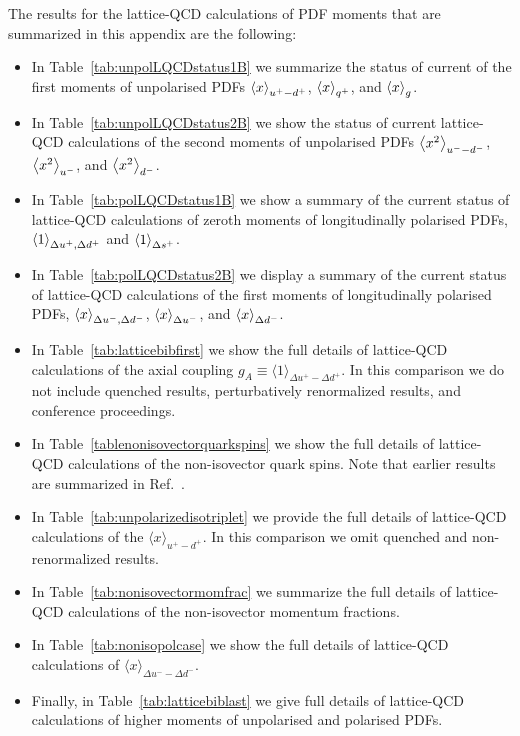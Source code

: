 The results for the lattice-QCD calculations of PDF moments that are summarized
in this appendix are the following:
\begin{itemize}

  \item In Table~\ref{tab:unpolLQCDstatus1B}
we summarize the status of current  of the
first moments of unpolarised PDFs $\left\langle x\right\rangle_{u^+-d^+}$, $\left\langle x\right\rangle_{q^+}$,
and $\left\langle x\right\rangle_g$.

\item In Table~\ref{tab:unpolLQCDstatus2B} we show
  the status of current lattice-QCD calculations of the second moments of unpolarised PDFs
  $\left\langle x^2\right\rangle_{u^--d^-}$, $\left\langle x^2\right\rangle_{u^-}$,
and $\left\langle x^2\right\rangle_{d^-}$.

\item In Table~\ref{tab:polLQCDstatus1B} we show
  a summary of the current status of lattice-QCD calculations of zeroth moments of
  longitudinally polarised PDFs,
  $\left\langle 1\right\rangle_{\Delta u^+,\Delta d^+}$ and $\left\langle 1\right\rangle_{\Delta s^+}$.

\item In Table~\ref{tab:polLQCDstatus2B} we display a summary of the current status of lattice-QCD calculations of the first moments of longitudinally polarised PDFs,
  $\left\langle x\right\rangle_{\Delta u^-,\Delta d^-}$, $\left\langle x\right\rangle_{\Delta u^-}$, and  $\left\langle x\right\rangle_{\Delta d^-}$.

\item In Table~\ref{tab:latticebibfirst} we show the full details of lattice-QCD calculations
  of the axial coupling $g_A\equiv\langle 1\rangle_{\Delta u^+-\Delta d^+}$.
  In this comparison we do not include
quenched results, perturbatively renormalized results, and conference proceedings.

\item In Table~\ref{tablenonisovectorquarkspins} we show
  the full details of lattice-QCD calculations of the non-isovector quark spins.
  Note that
  earlier results are summarized in Ref.~\cite{Liu:1995kb}.

\item In Table~\ref{tab:unpolarizedisotriplet} we provide the full details of
  lattice-QCD calculations of the $\langle x\rangle_{u^+-d^+}$.
  In this comparison we
  omit quenched and non-renormalized results.

\item In Table~\ref{tab:nonisovectormomfrac}
  we summarize
  the full details of lattice-QCD calculations of the non-isovector momentum fractions.

\item In Table~\ref{tab:nonisopolcase}
  we show the full details of lattice-QCD calculations of $\langle x\rangle_{\Delta u^--\Delta d^-}$.

\item Finally, in  Table~\ref{tab:latticebiblast} we
  give full details of lattice-QCD calculations of higher moments of unpolarised
  and polarised PDFs.

\end{itemize}

